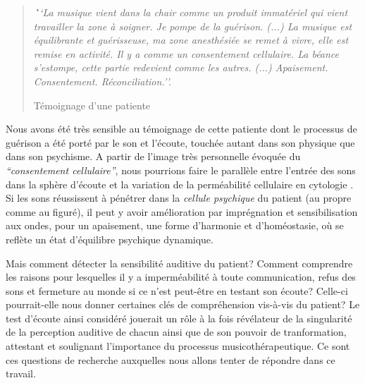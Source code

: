 

\begin{quotation}
 \textit{\textbf ``La musique vient dans la chair comme un produit immatériel
 qui vient travailler la zone à soigner. Je pompe de la
 guérison.
 (...)
 La musique est équilibrante et guérisseuse, ma zone
 anesthésiée se remet à vivre, elle est remise en activité.
 Il y a comme un consentement cellulaire.
La béance s'estompe, cette
partie redevient comme les autres. (...)
Apaisement. Consentement. Réconciliation.''.}

Témoignage d'une patiente

\end{quotation}



Nous avons été très sensible au témoignage de cette patiente dont le
processus de guérison a été porté par le son et l'écoute, touchée
autant dans son physique
que dans son psychisme.
A partir de l'image très personnelle évoquée du
\textit{``consentement cellulaire''}, nous pourrions faire le
parallèle entre l'entrée des sons dans la sphère d'écoute et la variation de la
perméabilité cellulaire en cytologie \autocite[70--76]{marieb:biologie}. Si les sons réussissent à pénétrer dans la
\textit{cellule psychique} du patient (au propre comme au figuré),  il peut y avoir amélioration par imprégnation et sensibilisation aux ondes, pour un apaisement, une forme d'harmonie et d'homéostasie,  \autocite[10]{marieb:biologie} où se reflète un état d'équilibre psychique dynamique.

Mais comment détecter la sensibilité auditive du patient?
Comment comprendre les raisons pour lesquelles il y a imperméabilité à toute communication, refus des sons et fermeture au monde si ce n'est
peut-être en testant
son écoute?  Celle-ci pourrait-elle nous donner certaines clés de compréhension vis-à-vis du patient?
Le test d'écoute ainsi considéré jouerait un rôle à la fois révélateur de la singularité de la perception auditive de chacun ainsi que de son pouvoir de tranformation, attestant et soulignant  l'importance du processus musicothérapeutique.
Ce sont ces questions de recherche auxquelles nous allons tenter de répondre dans ce travail.


